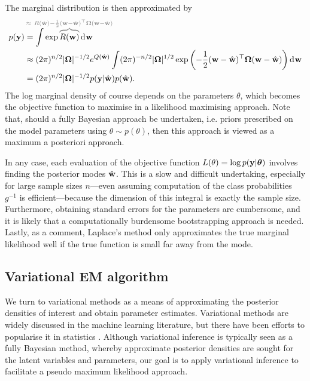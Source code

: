 The marginal distribution is then approximated by
\begin{align*}
  p(\by) 
  &= \int \exp
  \greyoverbrace{R(\bw)}{\hidewidth \approx \ R(\hat\bw) - \half (\bw - \hat\bw)^\top \bOmega (\bw - \hat\bw)\hidewidth}
   \dint \bw \\
  &\approx (2\pi)^{n/2} \abs{\bOmega}^{-1/2} e^{Q(\hat\bw)} 
  \int (2\pi)^{-n/2} \abs{\bOmega}^{1/2} \exp \left(- \half (\bw - \hat\bw)^\top \bOmega (\bw - \hat\bw) \right) \dint\bw \\
  &= (2\pi)^{n/2} \abs{\bOmega}^{-1/2} p(\by|\hat\bw)p(\hat\bw).
\end{align*} 
The log marginal density of course depends on the parameters $\theta$, which becomes the objective function to maximise in a likelihood maximising approach.
Note that, should a fully Bayesian approach be undertaken, i.e. priors prescribed on the model parameters using $\theta \sim p(\theta)$, then this approach is viewed as a maximum a posteriori approach.

In any case, each evaluation of the objective function $L(\theta) = \log p({\mathbf y}|{\bm\theta})$ involves finding the posterior modes $\hat{{\mathbf w}}$.
This is a slow and difficult undertaking, especially for large sample sizes $n$---even assuming computation of the class probabilities $g^{-1}$ is efficient---because the dimension of this integral is exactly the sample size.
Furthermore, obtaining standard errors for the parameters are cumbersome, and it is likely that a computationally burdensome bootstrapping approach is needed.
Lastly, as a comment, Laplace's method only approximates the true marginal likelihood well if the true function is small far away from the mode.

\subsection{Variational EM algorithm}

We turn to variational methods as a means of approximating the posterior densities of interest and obtain parameter estimates.
Variational methods are widely discussed in the machine learning literature, but there have been efforts to popularise it in statistics \citep{blei2017variational}.
Although variational inference is typically seen as a fully Bayesian method, whereby approximate posterior densities are sought for the latent variables and parameters, our goal is to apply variational inference to facilitate a pseudo maximum likelihood approach.

